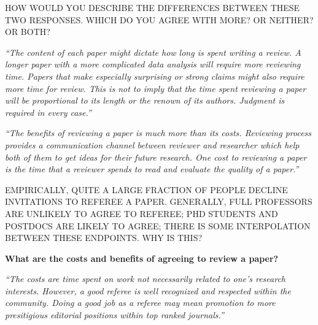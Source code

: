 \documentclass[portrait,11pt]{seminar}
\begin{document}
\medskip

HOW WOULD YOU DESCRIBE THE DIFFERENCES BETWEEN THESE TWO RESPONSES. WHICH DO YOU AGREE WITH MORE? OR NEITHER? OR BOTH?

\es
\bs

{\it  ``The content of each paper might dictate how long is spent writing a review. A longer paper with a more complicated data analysis will require more reviewing time. Papers that make especially surprising or strong claims might also require more time for review. This is not to imply that the time spent reviewing a paper will be proportional to its length or the renown of its authors. Judgment is required in every case.''}









\es {}

{\it ``The benefits of reviewing a paper is much more than its costs. Reviewing process provides a communication channel between reviewer and researcher which help both of them to get ideas for their future research. One cost to reviewing a paper is the time that a reviewer spends to read and evaluate the quality of a paper.''}

\medskip EMPIRICALLY, QUITE A LARGE FRACTION OF PEOPLE DECLINE INVITATIONS TO REFEREE A PAPER. GENERALLY, FULL PROFESSORS ARE UNLIKELY TO AGREE TO REFEREE; PHD STUDENTS AND POSTDOCS ARE LIKELY TO AGREE; THERE IS SOME INTERPOLATION BETWEEN THESE ENDPOINTS. WHY IS THIS?

\es
\bs
{\bf What are the costs and benefits of agreeing to review a paper?}

{\it ``The costs are time spent on work not necessarily related to one’s research interests. However, a good referee is well recognized and respected within the community. Doing a good job as a referee may mean promotion to more presitigious editorial positions within top ranked journals.''}
\end{document}
